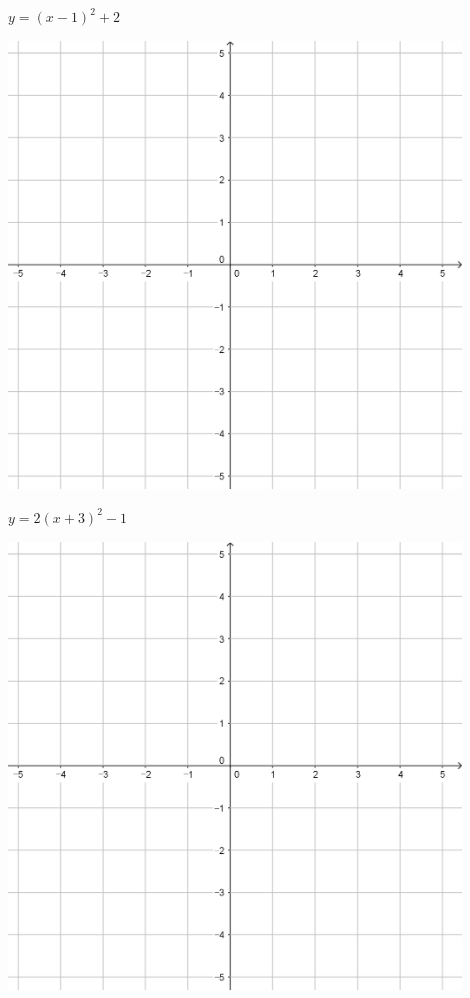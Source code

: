 \documentclass[a4paper]{oblivoir}
\begin{document}
\clearpage
\begin{minipage}{0.45\textwidth}\centering
\(y=(x-1)^2+2\)
\par\bigskip\includegraphics[width=0.9\textwidth]{55}
\end{minipage}
\begin{minipage}{0.45\textwidth}\centering
\(y=2(x+3)^2-1\)
\par\bigskip\includegraphics[width=0.9\textwidth]{55}
\end{minipage}\bigskip\bigskip\par
\end{document}
